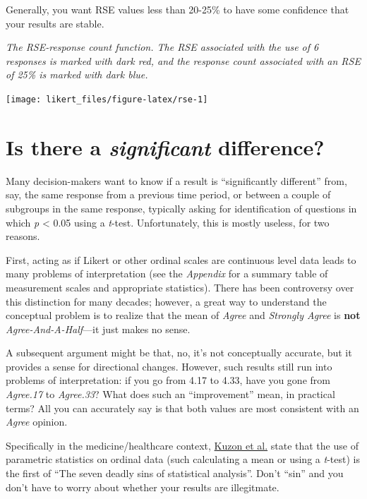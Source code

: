 \documentclass[]{book}
\begin{document}
Generally, you want RSE values less than 20-25\% to have some confidence
that your results are stable.

\emph{The RSE-response count function. The RSE associated with the use
of 6 responses is marked with dark red, and the response count
associated with an RSE of 25\% is marked with dark blue.}

\begin{center}\texttt{[image: likert\_files/figure-latex/rse-1]} \end{center}

\chapter{\texorpdfstring{Is there a \emph{significant}
difference?}{Is there a significant difference?}}\label{is-there-a-significant-difference}

Many decision-makers want to know if a result is ``significantly
different'' from, say, the same response from a previous time period, or
between a couple of subgroups in the same response, typically asking for
identification of questions in which \emph{p} \textless{} 0.05 using a
\emph{t}-test. Unfortunately, this is mostly useless, for two reasons.

First, acting as if Likert or other ordinal scales are continuous level
data leads to many problems of interpretation (see the \emph{Appendix}
for a summary table of measurement scales and appropriate statistics).
There has been controversy over this distinction for many decades;
however, a great way to understand the conceptual problem is to realize
that the mean of \emph{Agree} and \emph{Strongly Agree} is \textbf{not}
\emph{Agree-And-A-Half}---it just makes no sense.

A subsequent argument might be that, no, it's not conceptually accurate,
but it provides a sense for directional changes. However, such results
still run into problems of interpretation: if you go from 4.17 to 4.33,
have you gone from \emph{Agree.17} to \emph{Agree.33}? What does such an
``improvement'' mean, in practical terms? All you can accurately say is
that both values are most consistent with an \emph{Agree} opinion.

Specifically in the medicine/healthcare context,
\href{https://www.ncbi.nlm.nih.gov/pubmed/8883724}{Kuzon et al.} state
that the use of parametric statistics on ordinal data (such calculating
a mean or using a \emph{t}-test) is the first of ``The seven deadly sins
of statistical analysis''. Don't ``sin'' and you don't have to worry
about whether your results are illegitmate.
\end{document}
